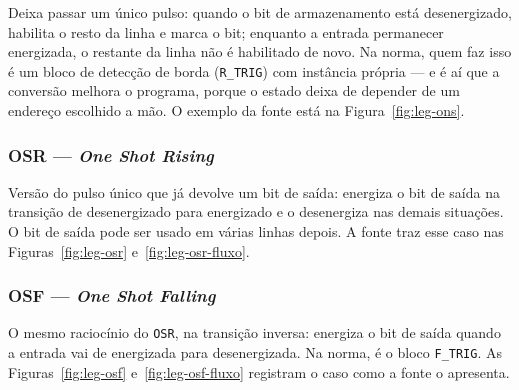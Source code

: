 Deixa passar um único pulso: quando o bit de armazenamento está desenergizado, habilita o resto da
linha e marca o bit; enquanto a entrada permanecer energizada, o restante da linha não é habilitado
de novo. Na norma, quem faz isso é um bloco de detecção de borda (\texttt{R\_TRIG}) com instância
própria --- e é aí que a conversão melhora o programa, porque o estado deixa de depender de um endereço
escolhido a mão.
O exemplo da fonte está na Figura~\ref{fig:leg-ons}.


\subsubsection{OSR --- \emph{One Shot Rising}}

Versão do pulso único que já devolve um bit de saída: energiza o bit de saída na transição de
desenergizado para energizado e o desenergiza nas demais situações. O bit de saída pode ser usado em
várias linhas depois.
A fonte traz esse caso nas Figuras~\ref{fig:leg-osr} e~\ref{fig:leg-osr-fluxo}.



\subsubsection{OSF --- \emph{One Shot Falling}}

O mesmo raciocínio do \texttt{OSR}, na transição inversa: energiza o bit de saída quando a entrada vai
de energizada para desenergizada. Na norma, é o bloco \texttt{F\_TRIG}.
As Figuras~\ref{fig:leg-osf} e~\ref{fig:leg-osf-fluxo} registram o caso como a fonte o apresenta.



